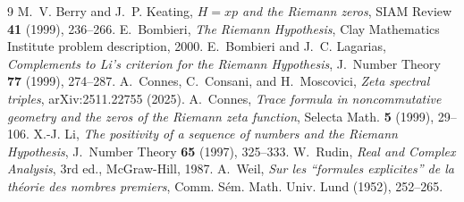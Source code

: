 \documentclass[11pt]{article}
\theoremstyle{plain}
\theoremstyle{definition}
\theoremstyle{remark}
\begin{document}
\begin{thebibliography}{9}
 M.~V. Berry and J.~P. Keating, \emph{$H=xp$ and the Riemann zeros},
  SIAM Review \textbf{41} (1999), 236--266.
 E.~Bombieri, \emph{The Riemann Hypothesis}, Clay Mathematics Institute
  problem description, 2000.
 E.~Bombieri and J.~C. Lagarias, \emph{Complements to Li's
  criterion for the Riemann Hypothesis}, J.~Number Theory \textbf{77} (1999), 274--287.
 A.~Connes, C.~Consani, and H.~Moscovici, \emph{Zeta spectral triples},
  arXiv:2511.22755 (2025).
 A.~Connes, \emph{Trace formula in noncommutative geometry and the zeros of
  the Riemann zeta function}, Selecta Math. \textbf{5} (1999), 29--106.
 X.-J. Li, \emph{The positivity of a sequence of numbers and the Riemann
  Hypothesis}, J.~Number Theory \textbf{65} (1997), 325--333.
 W.~Rudin, \emph{Real and Complex Analysis}, 3rd ed., McGraw-Hill, 1987.
 A.~Weil, \emph{Sur les ``formules explicites'' de la th\'eorie des nombres
  premiers}, Comm. S\'em. Math. Univ. Lund (1952), 252--265.
\end{thebibliography}
\end{document}
